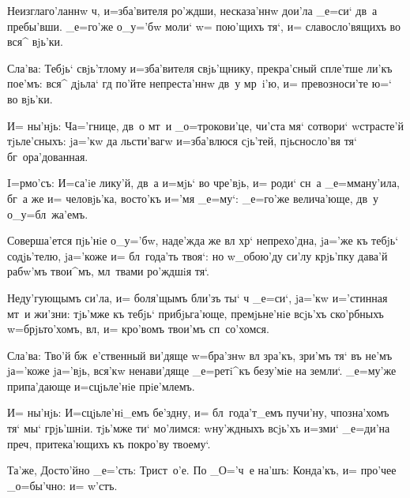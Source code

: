 Неизглаго'ланнw ч, и=зба'вителя ро'ждши, 
несказа'ннw дои'ла _е=си` дв~а пребы'вши. _е=го'же 
о_у='бw моли` w= пою'щихъ тя`, и= славосло'вящихъ во вся^ 
вjь'ки.

Сла'ва: Тебjь` свjь'тлому и=зба'вителя свjь'щнику, 
прекра'сный спле'тше ли'къ пое'мъ: вся^ дjьла` гд 
по'йте непреста'ннw дв~у мр~i'ю, и= превозноси'те ю=` во 
вjь'ки.

И= ны'нjь: Ч а='гнице, дв~о мт~и _о=трокови'це, 
чи'ста мя` сотвори` w\т страсте'й тjьле'сныхъ: jа='кw да 
льсти'вагw и=зба'влюся сjь'тей, пjьсносло'вя тя` 
бг~ора'дованная.


I=рмо'съ: И=са'iе лику'й, дв~а и=мjь` во чре'вjь, и= 
роди` сн~а _е=мману'ила, бг~а же и= человjь'ка, восто'къ 
и='мя _е=му`: _е=го'же велича'юще, дв~у о_у=бл~жа'емъ.

Соверша'ется пjь'нiе о_у='бw, наде'жда же вл 
хр` непрехо'дна, jа='же къ тебjь` содjь'телю, 
jа='коже и= бл~года'ть твоя`: но w\т_обою'ду си'лу 
крjь'пку дава'й рабw'мъ твои^мъ, мл~твами ро'ждшiя тя`.

Неду'гующымъ си'ла, и= боля'щымъ бли'зъ ты` ч 
_е=си`, jа='кw и='стинная мт~и жи'зни: тjь'мже къ тебjь` 
прибjьга'юще, премjьне'нiе всjь'хъ ско'рбныхъ 
w=брjьто'хомъ, вл, и= кро'вомъ твои'мъ сп~со'хомся.

Сла'ва: Тво'й бж~е'ственный ви'дяще w=бра'знw вл 
зра'къ, зри'мъ тя` въ не'мъ jа='коже jа='вjь, вся'кw 
ненави'дяще _е=ретi^къ безу'мiе на земли`. _е=му'же 
припа'дающе и=сцjьле'нiе прiе'млемъ.

И= ны'нjь: И=сцjьле'нi_емъ бе'здну, и= бл~года'т_емъ 
пучи'ну, ч позна'хомъ тя` мы` грjь'шнiи. тjь'мже ти` 
мо'лимся: w\т ну'ждныхъ всjь'хъ и=зми` _е=ди'на 
преч, притека'ющихъ къ покро'ву твоему`.

Та'же, Досто'йно _е='сть: Трист~о'е. По _О='ч~е на'шъ: 
Конда'къ, и= про'чее _о=бы'чно: и= w'стъ.
